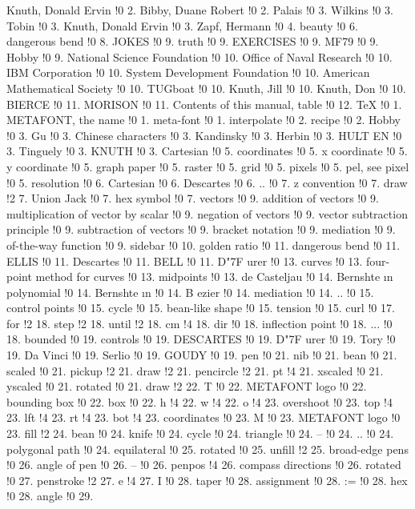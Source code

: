 Knuth, Donald Ervin !0 2.
Bibby, Duane Robert !0 2.
Palais !0 3.
Wilkins !0 3.
Tobin !0 3.
Knuth, Donald Ervin !0 3.
Zapf, Hermann !0 4.
beauty !0 6.
dangerous bend !0 8.
JOKES !0 9.
truth !0 9.
EXERCISES !0 9.
MF79 !0 9.
Hobby !0 9.
National Science Foundation !0 10.
Office of Naval Research !0 10.
IBM Corporation !0 10.
System Development Foundation !0 10.
American Mathematical Society !0 10.
TUGboat !0 10.
Knuth, Jill !0 10.
Knuth, Don !0 10.
BIERCE !0 11.
MORISON !0 11.
Contents of this manual, table !0 12.
TeX !0 1.
METAFONT, the name !0 1.
meta-font !0 1.
interpolate !0 2.
recipe !0 2.
Hobby !0 3.
Gu !0 3.
Chinese characters !0 3.
Kandinsky !0 3.
Herbin !0 3.
HULT{ E}N !0 3.
Tinguely !0 3.
KNUTH !0 3.
Cartesian !0 5.
coordinates !0 5.
x coordinate !0 5.
y coordinate !0 5.
graph paper !0 5.
raster !0 5.
grid !0 5.
pixels !0 5.
pel, see pixel !0 5.
resolution !0 6.
Cartesian !0 6.
Descartes !0 6.
.. !0 7.
z convention !0 7.
draw !2 7.
Union Jack !0 7.
hex symbol !0 7.
vectors !0 9.
addition of vectors !0 9.
multiplication of vector by scalar !0 9.
negation of vectors !0 9.
vector subtraction principle !0 9.
subtraction of vectors !0 9.
bracket notation !0 9.
mediation !0 9.
of-the-way function !0 9.
sidebar !0 10.
golden ratio !0 11.
dangerous bend !0 11.
ELLIS !0 11.
Descartes !0 11.
BELL !0 11.
D{\accent "7F u}rer !0 13.
curves !0 13.
four-point method for curves !0 13.
midpoints !0 13.
de Casteljau !0 14.
Bernshte{{ \i }}n polynomial !0 14.
Bernshte{{ \i }}n !0 14.
B{ e}zier !0 14.
mediation !0 14.
.. !0 15.
control points !0 15.
cycle !0 15.
bean-like shape !0 15.
tension !0 15.
curl !0 17.
for !2 18.
step !2 18.
until !2 18.
cm !4 18.
dir !0 18.
inflection point !0 18.
... !0 18.
bounded !0 19.
controls !0 19.
DESCARTES !0 19.
D{\accent "7F u}rer !0 19.
Tory !0 19.
Da Vinci !0 19.
Serlio !0 19.
GOUDY !0 19.
pen !0 21.
nib !0 21.
bean !0 21.
scaled !0 21.
pickup !2 21.
draw !2 21.
pencircle !2 21.
pt !4 21.
xscaled !0 21.
yscaled !0 21.
rotated !0 21.
draw !2 22.
T !0 22.
METAFONT logo !0 22.
bounding box !0 22.
box !0 22.
h !4 22.
w !4 22.
o !4 23.
overshoot !0 23.
top !4 23.
lft !4 23.
rt !4 23.
bot !4 23.
coordinates !0 23.
M !0 23.
METAFONT logo !0 23.
fill !2 24.
bean !0 24.
knife !0 24.
cycle !0 24.
triangle !0 24.
-- !0 24.
.. !0 24.
polygonal path !0 24.
equilateral !0 25.
rotated !0 25.
unfill !2 25.
broad-edge pens !0 26.
angle of pen !0 26.
-- !0 26.
penpos !4 26.
compass directions !0 26.
rotated !0 27.
penstroke !2 27.
e !4 27.
I !0 28.
taper !0 28.
assignment !0 28.
:= !0 28.
hex !0 28.
angle !0 29.
